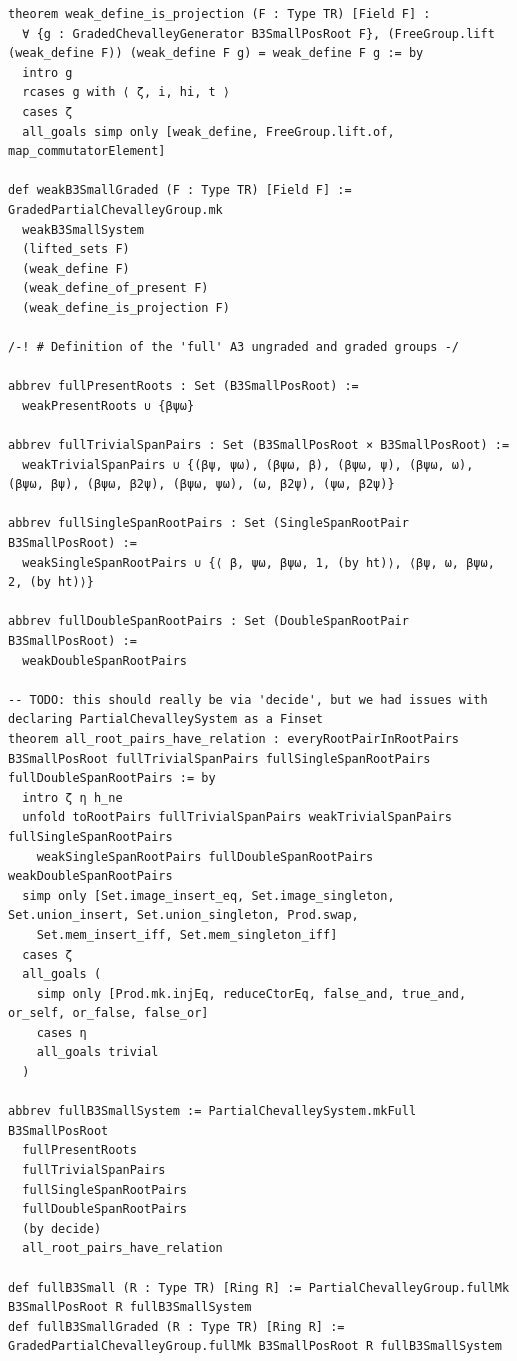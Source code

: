 \documentclass[10pt,a4paper]{article}
\begin{document}
\begin{Verbatim}
theorem weak_define_is_projection (F : Type TR) [Field F] :
  ∀ {g : GradedChevalleyGenerator B3SmallPosRoot F}, (FreeGroup.lift (weak_define F)) (weak_define F g) = weak_define F g := by
  intro g
  rcases g with ⟨ ζ, i, hi, t ⟩
  cases ζ
  all_goals simp only [weak_define, FreeGroup.lift.of, map_commutatorElement]

def weakB3SmallGraded (F : Type TR) [Field F] := GradedPartialChevalleyGroup.mk
  weakB3SmallSystem
  (lifted_sets F)
  (weak_define F)
  (weak_define_of_present F)
  (weak_define_is_projection F)

/-! # Definition of the 'full' A3 ungraded and graded groups -/

abbrev fullPresentRoots : Set (B3SmallPosRoot) :=
  weakPresentRoots ∪ {βψω}

abbrev fullTrivialSpanPairs : Set (B3SmallPosRoot × B3SmallPosRoot) :=
  weakTrivialSpanPairs ∪ {(βψ, ψω), (βψω, β), (βψω, ψ), (βψω, ω), (βψω, βψ), (βψω, β2ψ), (βψω, ψω), (ω, β2ψ), (ψω, β2ψ)}

abbrev fullSingleSpanRootPairs : Set (SingleSpanRootPair B3SmallPosRoot) :=
  weakSingleSpanRootPairs ∪ {⟨ β, ψω, βψω, 1, (by ht)⟩, ⟨βψ, ω, βψω, 2, (by ht)⟩}

abbrev fullDoubleSpanRootPairs : Set (DoubleSpanRootPair B3SmallPosRoot) :=
  weakDoubleSpanRootPairs

-- TODO: this should really be via 'decide', but we had issues with declaring PartialChevalleySystem as a Finset
theorem all_root_pairs_have_relation : everyRootPairInRootPairs B3SmallPosRoot fullTrivialSpanPairs fullSingleSpanRootPairs fullDoubleSpanRootPairs := by
  intro ζ η h_ne
  unfold toRootPairs fullTrivialSpanPairs weakTrivialSpanPairs fullSingleSpanRootPairs
    weakSingleSpanRootPairs fullDoubleSpanRootPairs weakDoubleSpanRootPairs
  simp only [Set.image_insert_eq, Set.image_singleton, Set.union_insert, Set.union_singleton, Prod.swap,
    Set.mem_insert_iff, Set.mem_singleton_iff]
  cases ζ
  all_goals (
    simp only [Prod.mk.injEq, reduceCtorEq, false_and, true_and, or_self, or_false, false_or]
    cases η
    all_goals trivial
  )

abbrev fullB3SmallSystem := PartialChevalleySystem.mkFull B3SmallPosRoot
  fullPresentRoots
  fullTrivialSpanPairs
  fullSingleSpanRootPairs
  fullDoubleSpanRootPairs
  (by decide)
  all_root_pairs_have_relation

def fullB3Small (R : Type TR) [Ring R] := PartialChevalleyGroup.fullMk B3SmallPosRoot R fullB3SmallSystem
def fullB3SmallGraded (R : Type TR) [Ring R] := GradedPartialChevalleyGroup.fullMk B3SmallPosRoot R fullB3SmallSystem


\end{Verbatim}
\end{document}
